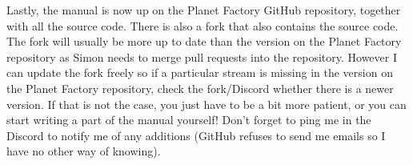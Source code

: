 \documentclass{article}
\begin{document}
Lastly, the manual is now up on the Planet Factory GitHub repository\cite{claudeGit}, together with all the source code. There is also a fork \cite{nomGit} that also contains the source code. 
The fork will usually be more up to date than the version on the Planet Factory repository as Simon needs to merge pull requests into the repository. However I can update the fork freely so if a 
particular stream is missing in the version on the Planet Factory repository, check the fork/Discord whether there is a newer version. If that is not the case, you just have to be a bit more 
patient, or you can start writing a part of the manual yourself! Don't forget to ping me in the Discord to notify me of any additions (GitHub refuses to send me emails so I have no other way of 
knowing).



























\newpage


\newpage


\end{document}
